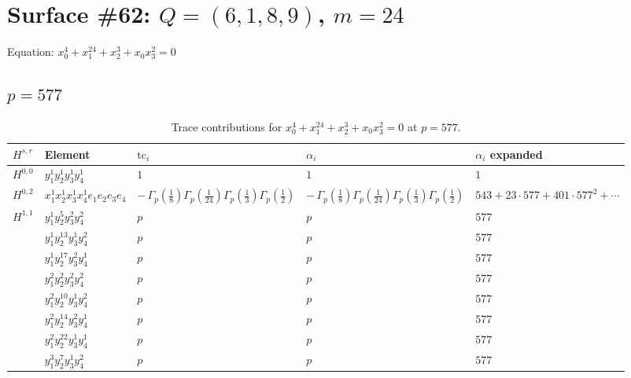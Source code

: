 \documentclass[11pt]{article}
\begin{document}
\newpage

\section*{Surface \#62: $Q=(6, 1, 8, 9)$, $m=24$}

Equation: $x_0^{4} + x_1^{24} + x_2^{3} + x_0 x_3^{2} = 0$

\subsection*{$p = 577$}

\begin{table}[ht]
\centering
\caption{Trace contributions for $x_0^{4} + x_1^{24} + x_2^{3} + x_0 x_3^{2} = 0$ at $p=577$.}\label{tab:deformed-62}
\renewcommand{\arraystretch}{1.1}
{\scriptsize
\begin{tabular}{@{}lllll@{}}
\toprule
$H^{s,r}$ & Element & $\mathrm{tc}_i$ & $\alpha_i$ & $\alpha_i$ expanded \\
\midrule
$H^{0,0}$ & $y_{1}^{1} y_{2}^{1} y_{3}^{1} y_{4}^{1}$ & $1$ & $1$ & $1$ \\
\midrule
$H^{0,2}$ & $x_{1}^{1} x_{2}^{1} x_{3}^{1} x_{4}^{1}  e_{1} e_{2} e_{3} e_{4}$ & $- \, \Gamma_p \left( \frac{1}{8} \right) \Gamma_p \left( \frac{1}{24} \right) \Gamma_p \left( \frac{1}{3} \right) \Gamma_p \left( \frac{1}{2} \right)$ & $- \, \Gamma_p \left( \frac{1}{8} \right) \Gamma_p \left( \frac{1}{24} \right) \Gamma_p \left( \frac{1}{3} \right) \Gamma_p \left( \frac{1}{2} \right)$ & $543{+}23{\cdot}577{+}401{\cdot}577^{2}{+}\cdots$ \\
\midrule
$H^{1,1}$ & $y_{1}^{1} y_{2}^{5} y_{3}^{2} y_{4}^{2}$ & $p \,$ & $p \,$ & $577$ \\
 & $y_{1}^{1} y_{2}^{13} y_{3}^{1} y_{4}^{2}$ & $p \,$ & $p \,$ & $577$ \\
 & $y_{1}^{1} y_{2}^{17} y_{3}^{2} y_{4}^{1}$ & $p \,$ & $p \,$ & $577$ \\
 & $y_{1}^{2} y_{2}^{2} y_{3}^{2} y_{4}^{2}$ & $p \,$ & $p \,$ & $577$ \\
 & $y_{1}^{2} y_{2}^{10} y_{3}^{1} y_{4}^{2}$ & $p \,$ & $p \,$ & $577$ \\
 & $y_{1}^{2} y_{2}^{14} y_{3}^{2} y_{4}^{1}$ & $p \,$ & $p \,$ & $577$ \\
 & $y_{1}^{2} y_{2}^{22} y_{3}^{1} y_{4}^{1}$ & $p \,$ & $p \,$ & $577$ \\
 & $y_{1}^{3} y_{2}^{7} y_{3}^{1} y_{4}^{2}$ & $p \,$ & $p \,$ & $577$ \\

\end{tabular}}
\end{table}
\end{document}
